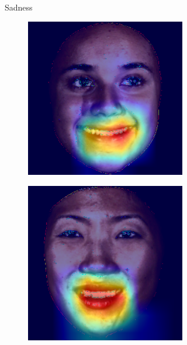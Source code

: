 \begin{figure}[ht]
\begin{subfigure}{0.45\textwidth}
\begin{subfigure}{0.45\textwidth}
        \end{subfigure}
        \caption{Sadness}
    \end{subfigure}

    \begin{subfigure}{0.45\textwidth}
        \centering
        \begin{subfigure}{0.45\textwidth}
            \includegraphics[width=\linewidth]{Images/Heatmaps/heatmap_happiness_1.png}
        \end{subfigure}
        \begin{subfigure}{0.45\textwidth}
            \includegraphics[width=\linewidth]{Images/Heatmaps/heatmap_happiness_2.png}

\end{subfigure}
\end{subfigure}
\end{figure}
